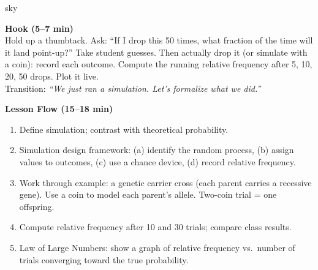 \documentclass[10pt]{article}
\begin{document}
\begin{skillbox}{sky}
\begin{minipage}[t]{0.48\linewidth}
    \textbf{Hook (5--7 min)}\\
    Hold up a thumbtack. Ask: ``If I drop this 50 times, what fraction of the time will
    it land point-up?'' Take student guesses. Then actually drop it (or simulate with a
    coin): record each outcome. Compute the running relative frequency after 5, 10, 20,
    50 drops. Plot it live.\\
    Transition: \textit{``We just ran a simulation. Let's formalize what we did.''}
\end{minipage}
\hfill
\begin{minipage}[t]{0.48\linewidth}
    \textbf{Lesson Flow (15--18 min)}
    \begin{enumerate}
        \item Define simulation; contrast with theoretical probability.
        \item Simulation design framework: (a) identify the random process, (b) assign
              values to outcomes, (c) use a chance device, (d) record relative frequency.
        \item Work through example: a genetic carrier cross (each parent carries a
              recessive gene). Use a coin to model each parent's allele. Two-coin trial
              = one offspring.
        \item Compute relative frequency after 10 and 30 trials; compare class results.
        \item Law of Large Numbers: show a graph of relative frequency vs.\ number of
              trials converging toward the true probability.
    \end{enumerate}
\end{minipage}
\end{skillbox}
\end{document}
